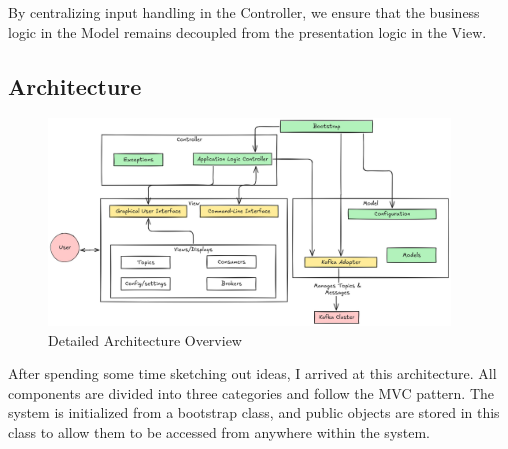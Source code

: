 \documentclass[10pt , a4paper]{report}
\begin{document}
By centralizing input handling in the Controller, we ensure that the business logic in the Model remains decoupled from the presentation logic in the View.

\subsection{Architecture}

\begin{figure}[htpb]
  \begin{center}
    \includegraphics[width=0.95\textwidth]{imgs/ArchitectureDetailed.png}
  \end{center}
  \caption{Detailed Architecture Overview}\label{fig:detailed_arch}
\end{figure}

After spending some time sketching out ideas, I arrived at this architecture. All components are divided into three categories and follow the MVC pattern. The system is initialized from a bootstrap class, and public objects are stored in this class to allow them to be accessed from anywhere within the system.
\end{document}
